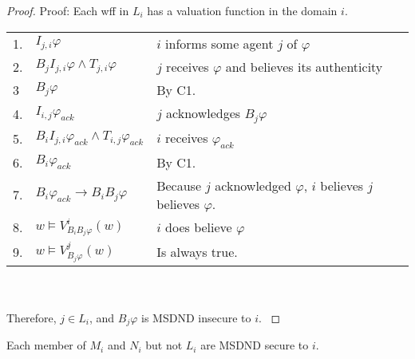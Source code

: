 \begin{proof}
Proof: Each wff in $L_i$ has a valuation function in the domain $i$.

\begin{table}[h!]
\centering
\small
\begin{tabularx}{\linewidth}{l l X}
1. & $I_{j,i} \varphi$ & $i$ informs some agent $j$ of $\varphi$ \\
2. & $B_{j}I_{j,i} \varphi \wedge T_{j,i} \varphi$ & $j$ receives $\varphi$ and believes its authenticity \\
3  & $B_j \varphi$ & By C1. \\
4. & $I_{i,j} \varphi_{ack}$ & $j$ acknowledges $B_j \varphi$ \\
5. & $B_{i}I_{j,i} \varphi_{ack} \wedge T_{i,j} \varphi_{ack}$ & $i$ receives $\varphi_{ack}$ \\
6. & $B_{i} \varphi_{ack}$ & By C1. \\
7. & $B_{i} \varphi_{ack} \rightarrow B_i B_j \varphi$ & Because $j$ acknowledged $\varphi$, $i$ believes $j$ believes $\varphi$. \\
8. & $w \vDash V_{B_i B_j \varphi}^{i}(w)$ & $i$ does believe $\varphi$ \\
9. & $w \vDash V_{B_j \varphi}^{j}(w)$ & Is always true. %
\end{tabularx} \\~\\
Therefore, $j \in L_i$, and $B_j \varphi$ is MSDND insecure to $i$.
\label{tab:lsetsecurity}
\end{table}
\end{proof}

\begin{thm}
Each member of $M_i$ and $N_i$ but not $L_i$ are MSDND secure to $i$.
\end{thm}

